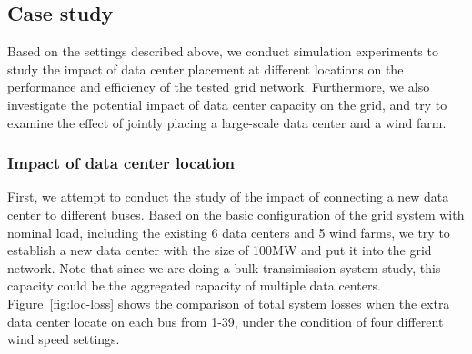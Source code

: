 \subsection{Case study}
Based on the settings described above, we conduct simulation experiments to study the impact of data center placement at different locations on the performance and efficiency of the tested grid network. Furthermore, we also investigate the potential impact of data center capacity on the grid, and try to examine the effect of jointly placing a large-scale data center and a wind farm.

\subsubsection{Impact of data center location}
First, we attempt to conduct the study of the impact of connecting a new data center to different buses. Based on the basic configuration of the grid system with nominal load, including the existing 6 data centers and 5 wind farms, we try to establish a new  data center with the size of 100MW and put it into the grid network. Note that since we are doing a bulk transimission system study, this capacity could be the aggregated capacity of multiple data centers. Figure~\ref{fig:loc-loss} shows the comparison of total system losses when the extra data center locate on each bus from 1-39, under the condition of four different wind speed settings. 


